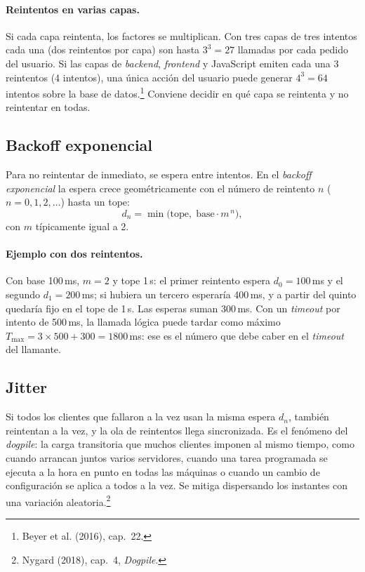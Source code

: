 \documentclass[variant=apuntes,cover=institutional,mode=screen]{ua-engineering-v6-article}
\begin{document}
\paragraph{Reintentos en varias capas.} Si cada capa reintenta, los factores se multiplican. Con tres capas de tres intentos cada una (dos reintentos por capa) son hasta $3^3 = 27$ llamadas por cada pedido del usuario. Si las capas de \emph{backend}, \emph{frontend} y JavaScript emiten cada una 3 reintentos (4 intentos), una única acción del usuario puede generar $4^3 = 64$ intentos sobre la base de datos.\footnote{Beyer et al. (2016), cap.~22.} Conviene decidir en qué capa se reintenta y no reintentar en todas.

\subsection{Backoff exponencial}

Para no reintentar de inmediato, se espera entre intentos. En el \emph{backoff exponencial} la espera crece geométricamente con el número de reintento $n$ ($n = 0, 1, 2,\dots$) hasta un tope:
\[
d_n = \min\bigl(\text{tope},\; \text{base}\cdot m^{\,n}\bigr),
\]
con $m$ típicamente igual a 2.

\paragraph{Ejemplo con dos reintentos.} Con base 100\,ms, $m = 2$ y tope 1\,s: el primer reintento espera $d_0 = 100$\,ms y el segundo $d_1 = 200$\,ms; si hubiera un tercero esperaría 400\,ms, y a partir del quinto quedaría fijo en el tope de 1\,s. Las esperas suman 300\,ms. Con un \emph{timeout} por intento de 500\,ms, la llamada lógica puede tardar como máximo $T_{\max} = 3 \times 500 + 300 = 1800$\,ms: ese es el número que debe caber en el \emph{timeout} del llamante.

\subsection{Jitter}

Si todos los clientes que fallaron a la vez usan la misma espera $d_n$, también reintentan a la vez, y la ola de reintentos llega sincronizada. Es el fenómeno del \emph{dogpile}: la carga transitoria que muchos clientes imponen al mismo tiempo, como cuando arrancan juntos varios servidores, cuando una tarea programada se ejecuta a la hora en punto en todas las máquinas o cuando un cambio de configuración se aplica a todos a la vez. Se mitiga dispersando los instantes con una variación aleatoria.\footnote{Nygard (2018), cap.~4, \emph{Dogpile}.}
\end{document}
